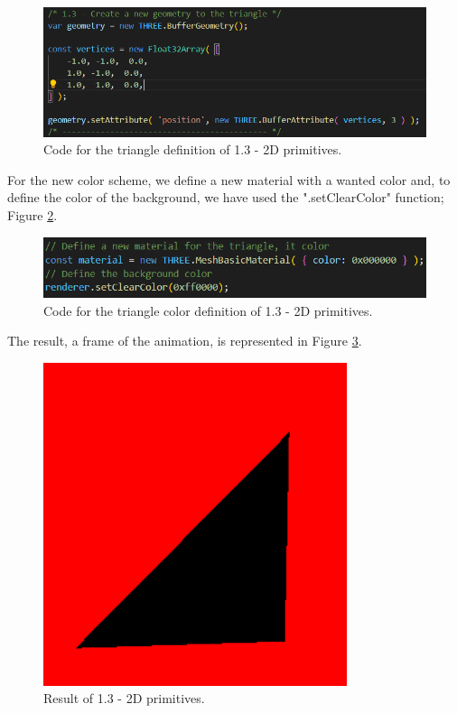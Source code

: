 \documentclass[12pt]{article}
\begin{document}
\begin{figure}[h!]
    \centering
        \includegraphics[width = \textwidth]{figs/ex13_1.png}
        \caption{Code for the triangle definition of 1.3 - 2D primitives.}
        \label{figs:ex13_1}
\end{figure}

For the new color scheme, we define a new material with a wanted color and, to define the color of the background, we have used the ".setClearColor" function; Figure \ref{figs:ex13_2}.

\begin{figure}[h!]
    \centering
        \includegraphics[width = \textwidth]{figs/ex13_2.png}
        \caption{Code for the triangle color definition of 1.3 - 2D primitives.}
        \label{figs:ex13_2}
\end{figure}

The result, a frame of the animation, is represented in Figure \ref{figs:ex13_resutl}.

\begin{figure}[h!]
    \centering
        \includegraphics[width = \textwidth]{figs/ex13_result.png}
        \caption{Result of 1.3 - 2D primitives.}
        \label{figs:ex13_resutl}
\end{figure}
\end{document}
